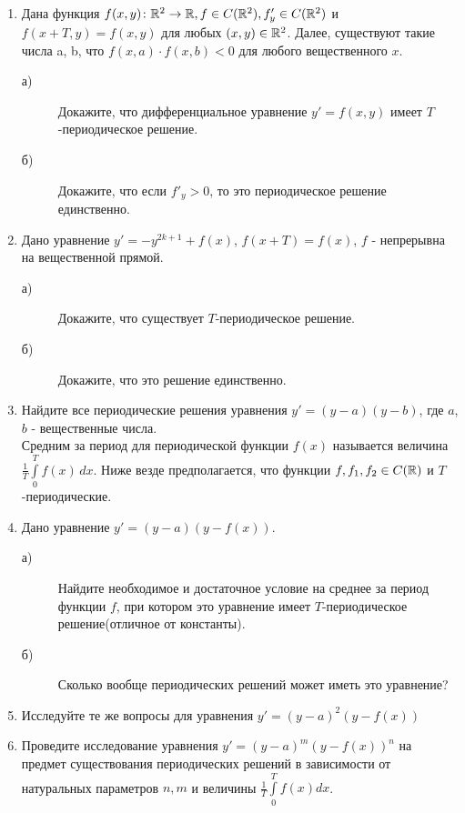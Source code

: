 \begin{enumerate}
\item Дана функция $f(x,y)\colon\mathbb{R}^2 \rightarrow \mathbb{R}, f \in C(\mathbb{R}^2), f'_y \in C(\mathbb{R}^2)$ и $f(x+T,y)=f(x,y)$ для любых $(x,y) \in \mathbb{R}^2$. Далее, существуют такие числа a, b, что $f(x,a)\cdot f(x,b)<0$ для любого вещественного $x$.\\
    \begin{description}
    \item [а) ]Докажите, что дифференциальное уравнение $y'=f(x,y)$ имеет $T$-периодическое решение.
    \item [б) ]Докажите, что если ${f'}_y>0$, то это периодическое решение единственно.
    \end{description}
\item Дано уравнение $y'=-y^{2k+1}+f(x)$, $f(x+T)=f(x)$, $f$ - непрерывна на вещественной прямой.
\begin{description}
    \item [а) ]Докажите, что существует $T$-периодическое решение.
    \item [б) ]Докажите, что это решение единственно.
    \end{description}
\item Найдите все периодические решения уравнения $y'=(y-a)(y-b)$, где $a$, $b$ - вещественные числа.\\
Средним за период для периодической функции $f(x)$ называется величина ${\frac{1}{T}} \int\limits_0^T f(x)\, dx$. Ниже везде предполагается, что функции $f, f_1, f_2 \in C(\mathbb{R})$ и $T$-периодические.
\item Дано уравнение $y'=(y-a)(y-f(x))$.
\begin{description}
    \item [а) ]Найдите необходимое и достаточное условие на среднее за период функции $f$, при котором это уравнение имеет $T$-периодическое решение(отличное от константы).
    \item [б) ]Сколько вообще периодических решений может иметь это уравнение?
    \end{description}
\item Исследуйте те же вопросы для уравнения $y'=(y-a)^2(y-f(x))$
\item Проведите исследование уравнения $y'=(y-a)^m(y-f(x))^n$ на предмет существования периодических решений в зависимости от натуральных параметров $n, m$ и величины ${\frac{1}{T}} \int\limits_0^T f(x) dx$.
\end{enumerate}